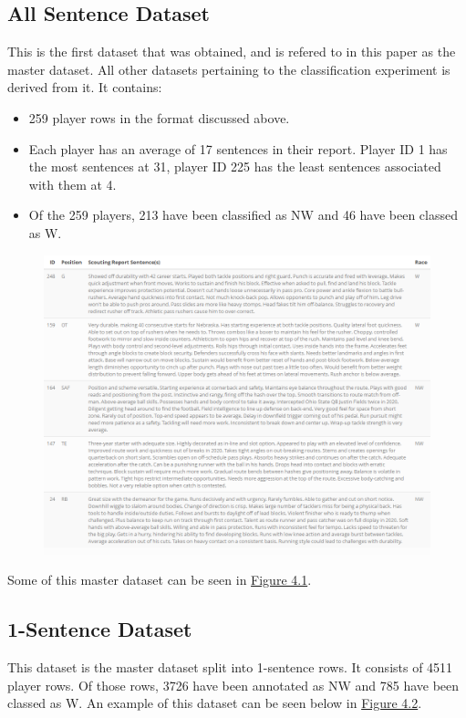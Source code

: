 \documentclass[oneside,12pt]{Classes/RoboticsLaTeX}
\begin{document}
\subsection{All Sentence Dataset}
This is the first dataset that was obtained, and is refered to in this paper as the master dataset. All other datasets pertaining to the classification experiment is derived from it. It contains:
\begin{itemize}
  \item 259 player rows in the format discussed above.
  \item Each player has an average of 17 sentences in their report. Player ID 1 has the most sentences at 31, player ID 225 has the least sentences associated with them at 4.
  \item Of the 259 players, 213 have been classified as NW and 46 have been classed as W.
\end{itemize}

\begin{figure}[hb]
  \centering
  \begin{minipage}{1\textwidth}
    \centering
    \includegraphics[width=1\linewidth]{Figures/all_sentence.png}
    \label{fig:master_dataset_sample}
  \end{minipage}%
\end{figure}
Some of this master dataset can be seen in \hyperref[fig:master_dataset_sample]{Figure 4.1}.
\subsection{1-Sentence Dataset}
This dataset is the master dataset split into 1-sentence rows. It consists of 4511 player rows. Of those rows, 3726 have been annotated as NW and 785 have been classed as W. An example of
this dataset can be seen below in \hyperref[fig:1-sentence_dataset_sample]{Figure 4.2}.
\end{document}
